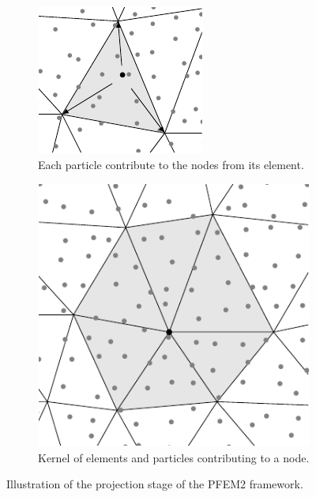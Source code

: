 \begin{figure} [htb]
\begin{subfigure}{0.47\textwidth}
    \centering
    \includegraphics[width=\textwidth]{img/lagrangian/projection.pdf}
    \caption{Each particle contribute to the nodes from its element.}
    \label{pfem2_projection}
\end{subfigure}
\hfill
\begin{subfigure}{0.47\textwidth}
    \centering
    \includegraphics[width=\textwidth]{img/lagrangian/projection_full.pdf}
    \caption{Kernel of elements and particles contributing to a node.}
    \label{pfem2_projection_full}
\end{subfigure}
\caption{Illustration of the projection stage of the PFEM2 framework.}
\label{pfem2_projection_full_illustrations}
\end{figure}


